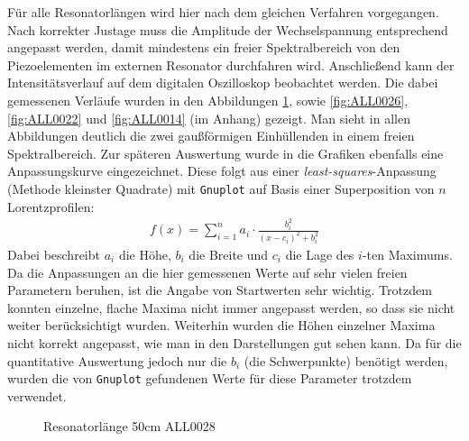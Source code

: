 \documentclass[11pt, a4paper]{article}
\numberwithin{equation}{section}
\begin{document}
Für alle Resonatorlängen wird hier nach dem gleichen Verfahren vorgegangen.
Nach korrekter Justage muss die Amplitude der Wechselspannung entsprechend angepasst werden, damit mindestens ein freier Spektralbereich von den Piezoelementen im externen Resonator durchfahren wird.
Anschließend kann der Intensitätsverlauf auf dem digitalen Oszilloskop beobachtet werden.
Die dabei gemessenen Verläufe wurden in den Abbildungen \ref{fig:ALL0028}, sowie \ref{fig:ALL0026}, \ref{fig:ALL0022} und \ref{fig:ALL0014} (im Anhang) gezeigt. 
Man sieht in allen Abbildungen deutlich die zwei gaußförmigen Einhüllenden in einem freien Spektralbereich.
Zur späteren Auswertung wurde in die Grafiken ebenfalls eine Anpassungskurve eingezeichnet.
Diese folgt aus einer \emph{least-squares}-Anpassung (Methode kleinster Quadrate) mit \texttt{Gnuplot} auf Basis einer Superposition von $n$ Lorentzprofilen:
\begin{align}
f(x)=\sum_{i=1}^{n}a_i\cdot\frac{b_i^2}{(x-c_i)^2+b_i^2}
\end{align}
Dabei beschreibt $a_i$ die Höhe, $b_i$ die Breite und $c_i$ die Lage des $i$-ten Maximums.
Da die Anpassungen an die hier gemessenen Werte auf sehr vielen freien Parametern beruhen, ist die Angabe von Startwerten sehr wichtig.
Trotzdem konnten einzelne, flache Maxima nicht immer angepasst werden, so dass sie nicht weiter berücksichtigt wurden.
Weiterhin wurden die Höhen einzelner Maxima nicht korrekt angepasst, wie man in den Darstellungen gut sehen kann.
Da für die quantitative Auswertung jedoch nur die $b_i$ (die Schwerpunkte) benötigt werden, wurden die von \texttt{Gnuplot} gefundenen Werte für diese Parameter trotzdem verwendet.
\begin{figure}[htb]
\centering

\caption{Resonatorlänge 50cm ALL0028}
\label{fig:ALL0028}
\end{figure}
\end{document}
